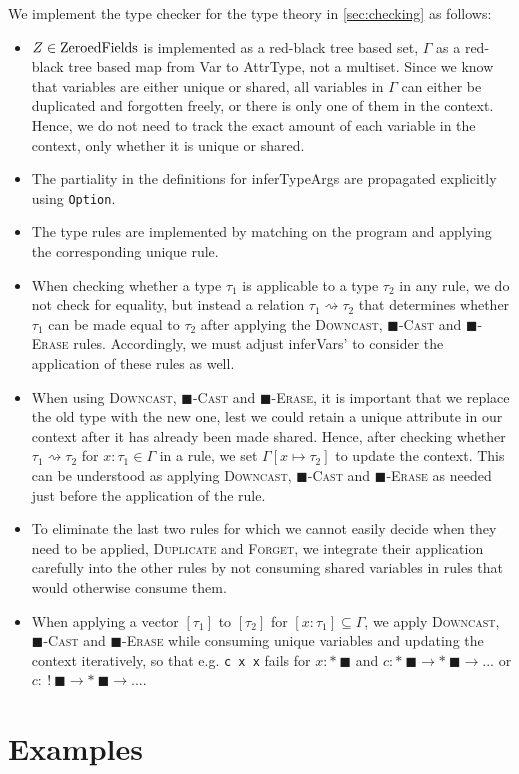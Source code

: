 We implement the type checker for the type theory in \cref{sec:checking} as follows:
\begin{itemize}
	\item $Z \in \mathrm{ZeroedFields}$ is implemented as a red-black tree based set, $\Gamma$ as a red-black tree based map from Var to AttrType, not a multiset. Since we know that variables are either unique or shared, all variables in $\Gamma$ can either be duplicated and forgotten freely, or there is only one of them in the context. Hence, we do not need to track the exact amount of each variable in the context, only whether it is unique or shared.
	\item The partiality in the definitions for inferTypeArgs are propagated explicitly using  \lstinline|Option|.
	\item The type rules are implemented by matching on the program and applying the corresponding unique rule.
	\item When checking whether a type $\tau_1$ is applicable to a type $\tau_2$ in any rule, we do not check for equality, but instead a relation $\tau_1 \rightsquigarrow \tau_2$ that determines whether $\tau_1$ can be made equal to $\tau_2$ after applying the \textsc{Downcast}, \textsc{$\blacksquare$-Cast} and \textsc{$\blacksquare$-Erase} rules. Accordingly, we must adjust inferVars' to consider the application of these rules as well.
	\item When using \textsc{Downcast}, \textsc{$\blacksquare$-Cast} and \textsc{$\blacksquare$-Erase}, it is important that we replace the old type with the new one, lest we could retain a unique attribute in our context after it has already been made shared. Hence, after checking whether $\tau_1 \rightsquigarrow \tau_2$ for $x : \tau_1 \in \Gamma$ in a rule, we set $\Gamma[x \mapsto \tau_2]$ to update the context. This can be understood as applying \textsc{Downcast}, \textsc{$\blacksquare$-Cast} and \textsc{$\blacksquare$-Erase} as needed just before the application of the rule.
	\item To eliminate the last two rules for which we cannot easily decide when they need to be applied, \textsc{Duplicate} and \textsc{Forget}, we integrate their application carefully into the other rules by not consuming shared variables in rules that would otherwise consume them.
	\item When applying a vector $[\tau_1]$ to $[\tau_2]$ for $[x : \tau_1] \subseteq \Gamma$, we apply \textsc{Downcast}, \textsc{$\blacksquare$-Cast} and \textsc{$\blacksquare$-Erase} while consuming unique variables and updating the context iteratively, so that e.g. \lstinline|c x x| fails for $x : *\ \blacksquare$ and $c : *\ \blacksquare \to *\ \blacksquare \to ...$ or $c :\ !\ \blacksquare \to *\ \blacksquare \to ...$.
\end{itemize}

\section{Examples}

